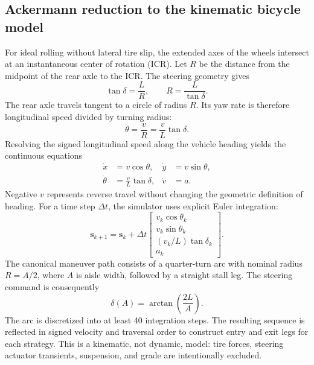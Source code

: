 \documentclass[11pt]{article}
\newcommand{\vect}[1]{\boldsymbol{#1}}
\begin{document}
\subsection{Ackermann reduction to the kinematic bicycle model}

For ideal rolling without lateral tire slip, the extended axes of the wheels intersect at an instantaneous center of rotation (ICR). Let $R$ be the distance from the midpoint of the rear axle to the ICR. The steering geometry gives
\begin{equation}
  \tan\delta=\frac{L}{R}, \qquad R=\frac{L}{\tan\delta}.
\end{equation}
The rear axle travels tangent to a circle of radius $R$. Its yaw rate is therefore longitudinal speed divided by turning radius:
\begin{equation}
  \dot{\theta}=\frac{v}{R}=\frac{v}{L}\tan\delta.
\end{equation}
Resolving the signed longitudinal speed along the vehicle heading yields the continuous equations
\begin{align}
  \dot{x} &= v\cos\theta, &
  \dot{y} &= v\sin\theta, \\
  \dot{\theta} &= \frac{v}{L}\tan\delta, &
  \dot{v} &= a.
  \label{eq:bicycle}
\end{align}
Negative $v$ represents reverse travel without changing the geometric definition of heading. For a time step $\Delta t$, the simulator uses explicit Euler integration:
\begin{equation}
\vect{s}_{k+1}=\vect{s}_k+\Delta t
\begin{bmatrix}
 v_k\cos\theta_k\\
 v_k\sin\theta_k\\
 (v_k/L)\tan\delta_k\\
 a_k
\end{bmatrix}.
\label{eq:euler}
\end{equation}
The canonical maneuver path consists of a quarter-turn arc with nominal radius $R=A/2$, where $A$ is aisle width, followed by a straight stall leg. The steering command is consequently
\begin{equation}
  \delta(A)=\arctan\!\left(\frac{2L}{A}\right).
\end{equation}
The arc is discretized into at least 40 integration steps. The resulting sequence is reflected in signed velocity and traversal order to construct entry and exit legs for each strategy. This is a kinematic, not dynamic, model: tire forces, steering actuator transients, suspension, and grade are intentionally excluded.
\end{document}
